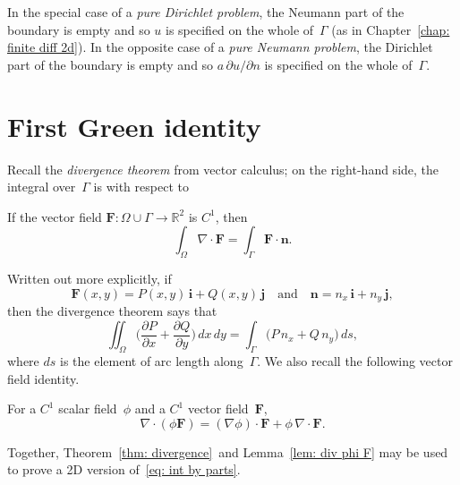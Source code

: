 In the special case of a \emph{pure Dirichlet problem}, the Neumann part of the 
boundary is empty and so $u$ is specified on the whole of~$\Gamma$ (as 
in Chapter~\ref{chap: finite diff 2d}).  In the opposite case of a 
\emph{pure Neumann problem}, the Dirichlet part of the boundary is empty and so 
$a\,\partial u/\partial n$ is specified on the whole of~$\Gamma$.

\section{First Green identity}

Recall the \emph{divergence theorem} from vector calculus; on the right-hand 
side, the integral over~$\Gamma$ is with respect to \

\begin{theorem}\label{thm: divergence}
If the vector field $\boldsymbol{F}:\Omega\cup\Gamma\to\mathbb{R}^2$ is $C^1$, 
then
\[
\int_\Omega\nabla\cdot\boldsymbol{F}
	=\int_\Gamma\boldsymbol{F}\cdot\boldsymbol{n}.
\]
\end{theorem}

Written out more explicitly, if 
\[
\boldsymbol{F}(x,y)=P(x,y)\,\boldsymbol{i}+Q(x,y)\,\boldsymbol{j}
\quad\text{and}\quad
\boldsymbol{n}=n_x\,\boldsymbol{i}+n_y\,\boldsymbol{j},
\]
then the divergence theorem says that
\[
\iint_\Omega\biggl(\frac{\partial P}{\partial x}+\frac{\partial Q}{\partial y}
	\biggr)\,dx\,dy=\int_\Gamma\bigl(P\,n_x+Q\,n_y)\,ds,
\]
where $ds$ is the element of arc length along~$\Gamma$.  We also recall the 
following vector field identity.

\begin{lemma}\label{lem: div phi F}
For a $C^1$ scalar field~$\phi$ and a $C^1$ vector field~$\boldsymbol{F}$,
\[
\nabla\cdot(\phi\boldsymbol{F})=(\nabla\phi)\cdot\boldsymbol{F}
	+\phi\,\nabla\cdot\boldsymbol{F}.
\]
\end{lemma}

Together, Theorem~\ref{thm: divergence}~and Lemma~\ref{lem: div phi F} may be 
used to prove a 2D version of~\eqref{eq: int by parts}.

